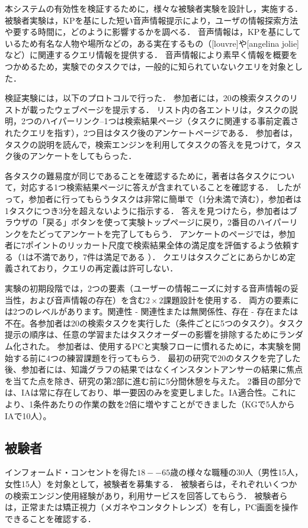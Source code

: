 \documentclass[pdflatex,ja=standard]{bxjsarticle}
\begin{document}
本システムの有効性を検証するために，様々な被験者実験を設計し，実施する．
被験者実験は，KPを基にした短い音声情報提示により，ユーザの情報探索方法や要する時間に，どのように影響するかを調べる．
音声情報は，KPを基にしているため有名な人物や場所などの，ある実在するもの（[louvre]や[angelina jolie]など）に関連するクエリ情報を提供する．
音声情報により素早く情報を概要をつかめるため，実験でのタスクでは，一般的に知られていないクエリを対象とした．

検証実験には，以下のプロトコルで行った．
参加者には，20の検索タスクのリストが載ったウェブページを提示する．
リスト内の各エントリは，タスクの説明，2つのハイパーリンク--1つは検索結果ページ（タスクに関連する事前定義されたクエリを指す），2つ目はタスク後のアンケートページである．
参加者は，タスクの説明を読んで，検索エンジンを利用してタスクの答えを見つけて，タスク後のアンケートをしてもらった．

各タスクの難易度が同じであることを確認するために，著者は各タスクについて，対応する1つ検索結果ページに答えが含まれていることを確認する．
したがって，参加者に行ってもらうタスクは非常に簡単で（1分未満で済む），参加者は1タスクにつき3分を超えないように指示する．
答えを見つけたら，参加者はブラウザの「戻る」ボタンを使って実験トップページに戻り，2番目のハイパーリンクをたどってアンケートを完了してもらう．
アンケートのページでは，参加者に7ポイントのリッカート尺度で検索結果全体の満足度を評価するよう依頼する（1は不満であり，7件は満足である ）．
クエリはタスクごとにあらかじめ定義されており，クエリの再定義は許可しない．

実験の初期段階では，2つの要素（ユーザーの情報ニーズに対する音声情報の妥当性，および音声情報の存在）を含む$2\times 2$課題設計を使用する．
両方の要素には2つのレベルがあります。関連性 - 関連性または無関係性、存在 - 存在または不在。各参加者は20の検索タスクを実行した（条件ごとに5つのタスク）。タスク提示の順序は、任意の学習またはタスクオーダーの影響を排除するためにランダム化された。
参加者は、使用するPCと実験フローに慣れるために，本実験を開始する前に4つの練習課題を行ってもらう．
最初の研究で20のタスクを完了した後、参加者には、知識グラフの結果ではなくインスタントアンサーの結果に焦点を当てた点を除き、研究の第2部に進む前に5分間休憩を与えた。 2番目の部分では、IAは常に存在しており、単一要因のみを変更しました。IA適合性。これにより、1条件あたりの作業の数を2倍に増やすことができました（KGで5人からIAで10人）。

\subsection{被験者}
インフォームド・コンセントを得た$18--65$歳の様々な職種の30人（男性15人，女性15人）を対象として，被験者を募集する．
被験者らは，それぞれいくつかの検索エンジン使用経験があり，利用サービスを回答してもらう．
被験者らは，正常または矯正視力（メガネやコンタクトレンズ）を有し，PC画面を操作できることを確認する．
\end{document}
